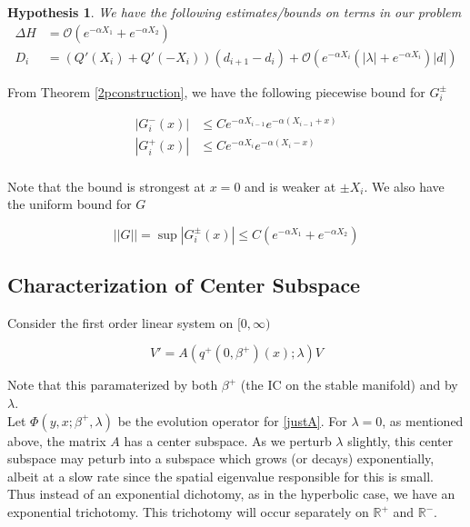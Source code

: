 \documentclass[12pt]{article}
\def\R{{\mathbb R}}
\newtheorem{hypothesis}{Hypothesis}
\begin{document}
\begin{hypothesis}\label{problembounds}
We have the following estimates/bounds on terms in our problem
\begin{align*}
\Delta H &= \mathcal{O}(e^{-\alpha X_1} + e^{-\alpha X_2} ) \\
D_i &= ( Q'(X_i) + Q'(-X_i))(d_{i+1} - d_i ) + \mathcal{O} \left( e^{-\alpha X_i} \left( |\lambda| +  e^{-\alpha X_i}  \right) |d| \right)
\end{align*}
\end{hypothesis}

From Theorem \ref{2pconstruction}, we have the following piecewise bound for $G_i^\pm$

\begin{align*}
|G_i^-(x)| &\leq C e^{-\alpha X_{i-1}} e^{-\alpha(X_{i-1} + x) } \\
|G_i^+(x)| &\leq C e^{-\alpha X_i} e^{-\alpha(X_i - x) } \\
\end{align*}

Note that the bound is strongest at $x = 0$ and is weaker at $\pm X_i$. We also have the uniform bound for $G$

\begin{equation}\label{uniformG}  
||G|| = \sup |G_i^\pm(x)| \leq C (e^{-\alpha X_1} + e^{-\alpha X_2})
\end{equation}

\subsection{Characterization of Center Subspace}

Consider the first order linear system on $[0, \infty)$

\begin{equation}\label{justA}
V' = A(q^+(0, \beta^+)(x); \lambda) V
\end{equation}

Note that this paramaterized by both $\beta^+$ (the IC on the stable manifold) and by $\lambda$.\\

Let $\Phi(y, x; \beta^+, \lambda)$ be the evolution operator for \eqref{justA}. For $\lambda = 0$, as mentioned above, the matrix $A$ has a center subspace. As we perturb $\lambda$ slightly, this center subspace may peturb into a subspace which grows (or decays) exponentially, albeit at a slow rate since the spatial eigenvalue responsible for this is small. Thus instead of an exponential dichotomy, as in the hyperbolic case, we have an exponential trichotomy. This trichotomy will occur separately on $\R^+$ and $\R^-$.\\
\end{document}
